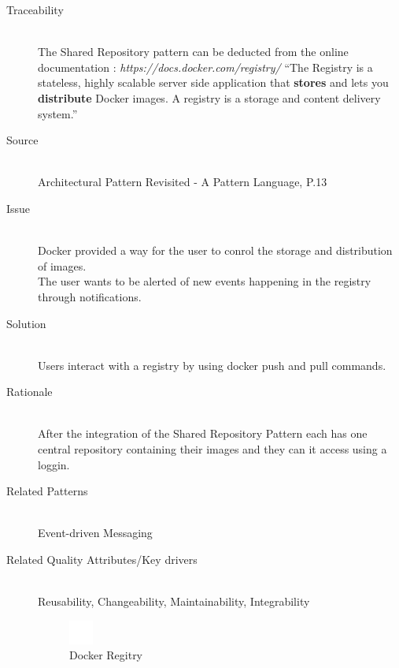 \begin{description}
\item[Traceability]~\\
The Shared Repository pattern can be deducted from the online documentation : \textit{https://docs.docker.com/registry/} ``The Registry is a stateless, highly scalable server side application that \textbf{stores} and lets you \textbf{distribute} Docker images. A registry is a storage and content delivery system.''


\item[Source]~\\
Architectural Pattern Revisited - A Pattern Language, P.13 \cite{avgeriou2005architectural}

\item[Issue]~\\
Docker provided a way for the user to conrol the storage and distribution of images. \\
The user wants to be alerted of new events happening in the registry through notifications. %


\item[Solution]~\\ %
Users interact with a registry by using docker push and pull commands.

\item[Rationale]~\\ %
 After the integration of the Shared Repository Pattern each has one central repository containing their images and they can it access using a loggin. \\

\item [Related Patterns]~\\
Event-driven Messaging

\item [Related Quality Attributes/Key drivers]~\\
Reusability, Changeability, Maintainability, Integrability

 \begin{figure}[H]
 \centering
 \includegraphics[scale=0.7]{5-patterns/images/docker-repository.png}
 \caption{Docker Regitry}
 \label{fig:docker-registry}
 \end{figure}

\end{description}

